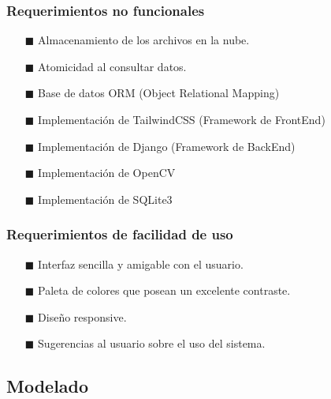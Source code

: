 \documentclass[conference]{IEEEtran}
\begin{document}
\subsubsection{Requerimientos no funcionales}
\begin{itemize}
	\item[$\blacksquare$] Almacenamiento de los archivos en la nube.
	\item[$\blacksquare$] Atomicidad al consultar datos.
	\item[$\blacksquare$] Base de datos ORM (Object Relational Mapping)
	\item[$\blacksquare$] Implementación de TailwindCSS (Framework de FrontEnd)
	\item[$\blacksquare$] Implementación de Django (Framework de BackEnd)
	\item[$\blacksquare$] Implementación de OpenCV	\item[$\blacksquare$] Implementación de SQLite3
\end{itemize}

\subsubsection{Requerimientos de facilidad de uso}
\begin{itemize}
	\item[$\blacksquare$] Interfaz sencilla y amigable con el usuario.
	\item[$\blacksquare$] Paleta de colores que posean un excelente contraste.
	\item[$\blacksquare$] Diseño responsive. 
	\item[$\blacksquare$] Sugerencias al usuario sobre el uso del sistema.
\end{itemize}

\subsection{Modelado}
\end{document}
